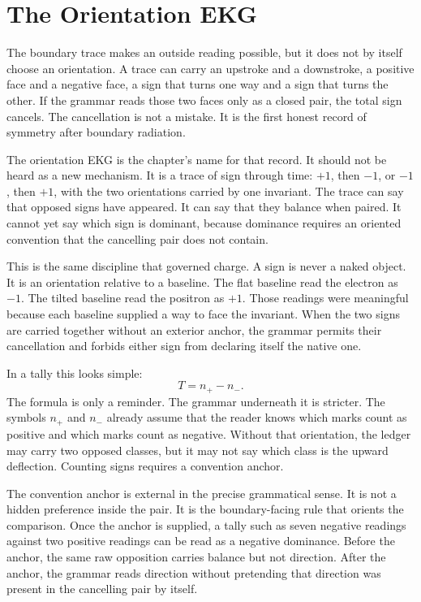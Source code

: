 \section{The Orientation EKG}

The boundary trace makes an outside reading possible, but it does not by
itself choose an orientation. A trace can carry an upstroke and a downstroke,
a positive face and a negative face, a sign that turns one way and a sign
that turns the other. If the grammar reads those two faces only as a closed
pair, the total sign cancels. The cancellation is not a mistake. It is the
first honest record of symmetry after boundary radiation.

The orientation EKG is the chapter's name for that record. It should not be
heard as a new mechanism. It is a trace of sign through time: \(+1\), then
\(-1\), or \(-1\), then \(+1\), with the two orientations carried by one
invariant. The trace can say that opposed signs have appeared. It can say
that they balance when paired. It cannot yet say which sign is dominant,
because dominance requires an oriented convention that the cancelling pair
does not contain.

This is the same discipline that governed charge. A sign is never a naked
object. It is an orientation relative to a baseline. The flat baseline read
the electron as \(-1\). The tilted baseline read the positron as \(+1\).
Those readings were meaningful because each baseline supplied a way to face
the invariant. When the two signs are carried together without an exterior
anchor, the grammar permits their cancellation and forbids either sign from
declaring itself the native one.

In a tally this looks simple:
\[
  T = n_+ - n_- .
\]
The formula is only a reminder. The grammar underneath it is stricter. The
symbols \(n_+\) and \(n_-\) already assume that the reader knows which marks
count as positive and which marks count as negative. Without that
orientation, the ledger may carry two opposed classes, but it may not say
which class is the upward deflection. Counting signs requires a convention
anchor.

The convention anchor is external in the precise grammatical sense. It is
not a hidden preference inside the pair. It is the boundary-facing rule that
orients the comparison. Once the anchor is supplied, a tally such as seven
negative readings against two positive readings can be read as a negative
dominance. Before the anchor, the same raw opposition carries balance but not
direction. After the anchor, the grammar reads direction without pretending
that direction was present in the cancelling pair by itself.

